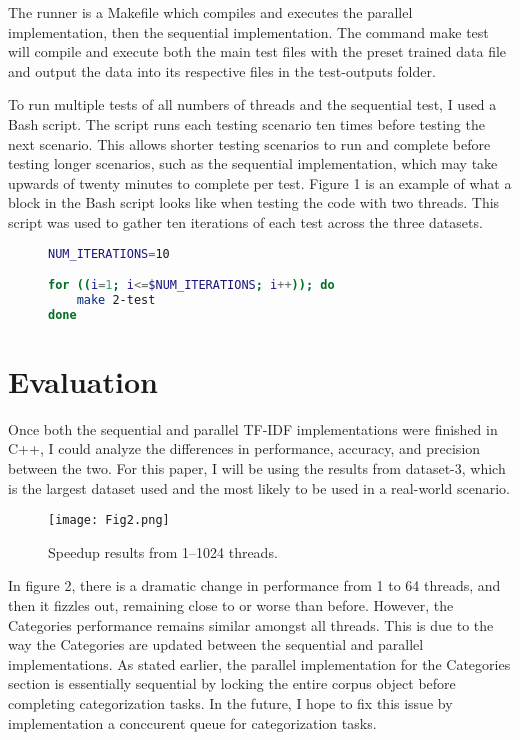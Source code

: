 \documentclass[conference]{IEEEtran}
\begin{document}
The runner is a Makefile which compiles and executes the parallel implementation, then the sequential implementation. The command make test will compile and execute both the main test files with the preset trained data file and output the data into its respective files in the test-outputs folder.

To run multiple tests of all numbers of threads and the sequential test, I used a Bash script. The script runs each testing scenario ten times before testing the next scenario. This allows shorter testing scenarios to run and complete before testing longer scenarios, such as the sequential implementation, which may take upwards of twenty minutes to complete per test. Figure 1 is an example of what a block in the Bash script looks like when testing the code with two threads. This script was used to gather ten iterations of each test across the three datasets.

\begin{figure}[htbp]
\centering    
\begin{minipage}{0.95\linewidth}
\begin{lstlisting}[style=ieeecpp, language=bash]
NUM_ITERATIONS=10

for ((i=1; i<=$NUM_ITERATIONS; i++)); do
    make 2-test
done
\end{lstlisting}
\end{minipage}
\end{figure}

\section{Evaluation}
Once both the sequential and parallel TF-IDF implementations were finished in C++, I could analyze the differences in performance, accuracy, and precision between the two. For this paper, I will be using the results from dataset-3, which is the largest dataset used and the most likely to be used in a real-world scenario.

\begin{figure}[htbp]
\centerline{\texttt{[image: Fig2.png]}}
\caption{Speedup results from 1--1024 threads.}
\label{fig}
\end{figure}

In figure 2, there is a dramatic change in performance from 1 to 64 threads, and then it fizzles out, remaining close to or worse than before. However, the Categories performance remains similar amongst all threads. This is due to the way the Categories are updated between the sequential and parallel implementations. As stated earlier, the parallel implementation for the Categories section is essentially sequential by locking the entire corpus object before completing categorization tasks. In the future, I hope to fix this issue by implementation a conccurent queue for categorization tasks.
\end{document}
